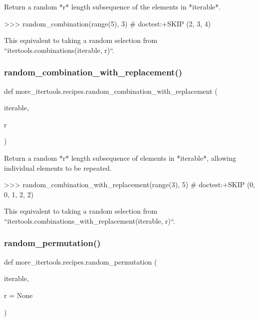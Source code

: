 \begin{DoxyVerb}Return a random *r* length subsequence of the elements in *iterable*.

    >>> random_combination(range(5), 3)  # doctest:+SKIP
    (2, 3, 4)

This equivalent to taking a random selection from
``itertools.combinations(iterable, r)``.\end{DoxyVerb}
 \mbox{\label{namespacemore__itertools_1_1recipes_a872452acad1fd3105000cb6d30b33bc0}} 
\subsubsection{\texorpdfstring{random\+\_\+combination\+\_\+with\+\_\+replacement()}{random\_combination\_with\_replacement()}}
{\footnotesize\ttfamily def more\+\_\+itertools.\+recipes.\+random\+\_\+combination\+\_\+with\+\_\+replacement (\begin{DoxyParamCaption}\item[{}]{iterable,  }\item[{}]{r }\end{DoxyParamCaption})}

\begin{DoxyVerb}Return a random *r* length subsequence of elements in *iterable*,
allowing individual elements to be repeated.

    >>> random_combination_with_replacement(range(3), 5) # doctest:+SKIP
    (0, 0, 1, 2, 2)

This equivalent to taking a random selection from
``itertools.combinations_with_replacement(iterable, r)``.\end{DoxyVerb}
 \mbox{\label{namespacemore__itertools_1_1recipes_a2a5a87c0a50c30bb8da6d078d5bbdec1}} 
\subsubsection{\texorpdfstring{random\+\_\+permutation()}{random\_permutation()}}
{\footnotesize\ttfamily def more\+\_\+itertools.\+recipes.\+random\+\_\+permutation (\begin{DoxyParamCaption}\item[{}]{iterable,  }\item[{}]{r = {\ttfamily None} }\end{DoxyParamCaption})}

